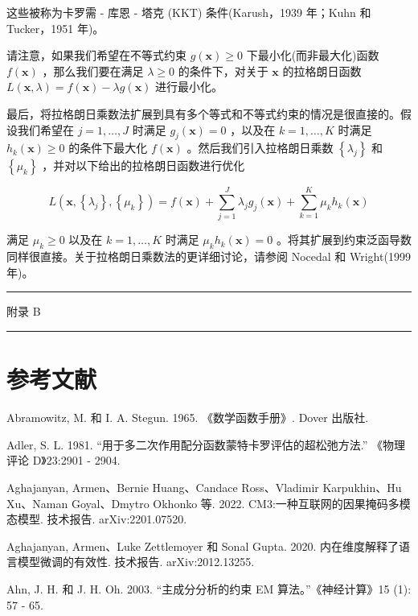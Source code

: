 \documentclass[10pt]{report}
\newcommand{\HRule}{\begin{center}\rule{0.9\linewidth}{0.2mm}\end{center}}
\begin{document}
这些被称为卡罗需 - 库恩 - 塔克 (KKT) 条件(Karush，1939 年；Kuhn 和 Tucker，1951 年)。

请注意，如果我们希望在不等式约束 \(g\left( \mathbf{x}\right)  \geq  0\) 下最小化(而非最大化)函数 \(f\left( \mathbf{x}\right)\) ，那么我们要在满足 \(\lambda  \geq  0\) 的条件下，对关于 \(\mathbf{x}\) 的拉格朗日函数 \(L\left( {\mathbf{x},\lambda }\right)  = f\left( \mathbf{x}\right)  - {\lambda g}\left( \mathbf{x}\right)\) 进行最小化。

最后，将拉格朗日乘数法扩展到具有多个等式和不等式约束的情况是很直接的。假设我们希望在 \(j = 1,\ldots ,J\) 时满足 \({g}_{j}\left( \mathbf{x}\right)  = 0\) ，以及在 \(k = 1,\ldots ,K\) 时满足 \({h}_{k}\left( \mathbf{x}\right)  \geq  0\) 的条件下最大化 \(f\left( \mathbf{x}\right)\) 。然后我们引入拉格朗日乘数 \(\left\{  {\lambda }_{j}\right\}\) 和 \(\left\{  {\mu }_{k}\right\}\) ，并对以下给出的拉格朗日函数进行优化

\[
L\left( {\mathbf{x},\left\{  {\lambda }_{j}\right\}  ,\left\{  {\mu }_{k}\right\}  }\right)  = f\left( \mathbf{x}\right)  + \mathop{\sum }\limits_{{j = 1}}^{J}{\lambda }_{j}{g}_{j}\left( \mathbf{x}\right)  + \mathop{\sum }\limits_{{k = 1}}^{K}{\mu }_{k}{h}_{k}\left( \mathbf{x}\right)  \tag{C.12}
\]

满足 \({\mu }_{k} \geq  0\) 以及在 \(k = 1,\ldots ,K\) 时满足 \({\mu }_{k}{h}_{k}\left( \mathbf{x}\right)  = 0\) 。将其扩展到约束泛函导数同样很直接。关于拉格朗日乘数法的更详细讨论，请参阅 Nocedal 和 Wright(1999 年)。

\HRule

附录 B

\HRule

\section*{参考文献}

Abramowitz, M. 和 I. A. Stegun. 1965. 《数学函数手册》. Dover 出版社.

Adler, S. L. 1981. “用于多二次作用配分函数蒙特卡罗评估的超松弛方法.” 《物理评论 D》23:2901 - 2904.

Aghajanyan, Armen、Bernie Huang、Candace Ross、Vladimir Karpukhin、Hu Xu、Naman Goyal、Dmytro Okhonko 等. 2022. CM3:一种互联网的因果掩码多模态模型. 技术报告. arXiv:2201.07520.

Aghajanyan, Armen、Luke Zettlemoyer 和 Sonal Gupta. 2020. 内在维度解释了语言模型微调的有效性. 技术报告. arXiv:2012.13255.

Ahn, J. H. 和 J. H. Oh. 2003. “主成分分析的约束 EM 算法。”《神经计算》15 (1): 57 - 65.
\end{document}
